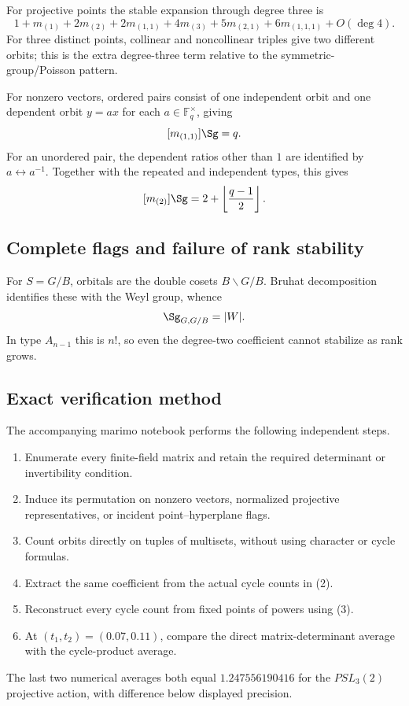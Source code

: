 \documentclass[10pt]{article}
\newcommand{\F}{\mathbb F}
\begin{document}
For projective points the stable expansion through degree three is
\begin{equation}
 1+m_{(1)}+2m_{(2)}+2m_{(1,1)}
 +4m_{(3)}+5m_{(2,1)}+6m_{(1,1,1)}+O(\deg4).
\end{equation}
For three distinct points, collinear and noncollinear triples give two
different orbits; this is the extra degree-three term relative to the
symmetric-group/Poisson pattern.

For nonzero vectors, ordered pairs consist of one independent orbit and one
dependent orbit $y=ax$ for each $a\in\F_q^\times$, giving
\[
 [m_{(1,1)}]\Sg=q.
\]
For an unordered pair, the dependent ratios other than $1$ are identified by
$a\leftrightarrow a^{-1}$.  Together with the repeated and independent types,
this gives
\[
 [m_{(2)}]\Sg=2+\left\lfloor\frac{q-1}{2}\right\rfloor.
\]

\subsection{Complete flags and failure of rank stability}
For $S=G/B$, orbitals are the double cosets $B\backslash G/B$.  Bruhat
decomposition identifies these with the Weyl group, whence
\begin{equation}
 [m_{(1,1)}]\Sg_{G,G/B}=|W|.
\end{equation}
In type $A_{n-1}$ this is $n!$, so even the degree-two coefficient cannot
stabilize as rank grows.

\subsection{Exact verification method}
The accompanying marimo notebook performs the following independent steps.
\begin{enumerate}
 \item Enumerate every finite-field matrix and retain the required determinant
 or invertibility condition.
 \item Induce its permutation on nonzero vectors, normalized projective
 representatives, or incident point--hyperplane flags.
 \item Count orbits directly on tuples of multisets, without using character
 or cycle formulas.
 \item Extract the same coefficient from the actual cycle counts in (2).
 \item Reconstruct every cycle count from fixed points of powers using (3).
 \item At $(t_1,t_2)=(0.07,0.11)$, compare the direct matrix-determinant
 average with the cycle-product average.
\end{enumerate}
The last two numerical averages both equal $1.247556190416$ for the
$PSL_3(2)$ projective action, with difference below displayed precision.
\end{document}
